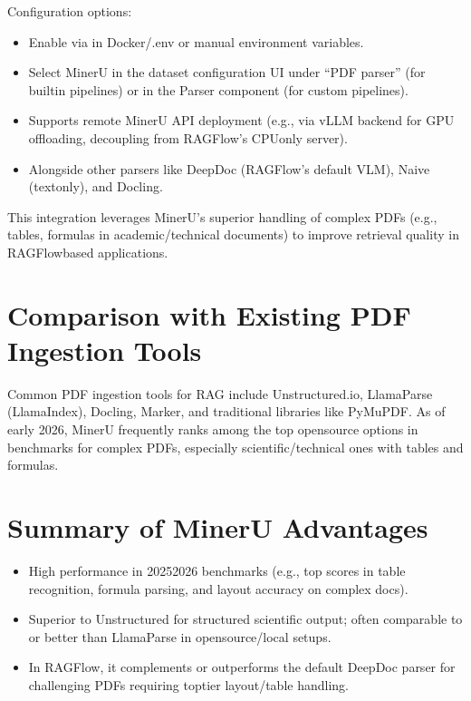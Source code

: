 \documentclass[letterpaper,10pt,english]{sphinxmanual}
\begin{document}
\sphinxAtStartPar
Configuration options:
\begin{itemize}
\item {} 
\sphinxAtStartPar
Enable via  in Docker/.env or manual environment
variables.

\item {} 
\sphinxAtStartPar
Select MinerU in the dataset configuration UI under “PDF parser” (for
built\sphinxhyphen{}in pipelines) or in the Parser component (for custom
pipelines).

\item {} 
\sphinxAtStartPar
Supports remote MinerU API deployment (e.g., via vLLM backend for GPU
offloading, decoupling from RAGFlow’s CPU\sphinxhyphen{}only server).

\item {} 
\sphinxAtStartPar
Alongside other parsers like DeepDoc (RAGFlow’s default VLM), Naive
(text\sphinxhyphen{}only), and Docling.

\end{itemize}

\sphinxAtStartPar
This integration leverages MinerU’s superior handling of complex PDFs
(e.g., tables, formulas in academic/technical documents) to improve
retrieval quality in RAGFlow\sphinxhyphen{}based applications.


\section{Comparison with Existing PDF Ingestion Tools}
\label{\detokenize{minerU:comparison-with-existing-pdf-ingestion-tools}}
\sphinxAtStartPar
Common PDF ingestion tools for RAG include Unstructured.io, LlamaParse
(LlamaIndex), Docling, Marker, and traditional libraries like PyMuPDF.
As of early 2026, MinerU frequently ranks among the top open\sphinxhyphen{}source
options in benchmarks for complex PDFs, especially scientific/technical
ones with tables and formulas.


\section{Summary of MinerU Advantages}
\label{\detokenize{minerU:summary-of-mineru-advantages}}\begin{itemize}
\item {} 
\sphinxAtStartPar
High performance in 2025\textendash{}2026 benchmarks (e.g., top scores in table
recognition, formula parsing, and layout accuracy on complex docs).

\item {} 
\sphinxAtStartPar
Superior to Unstructured for structured scientific output; often
comparable to or better than LlamaParse in open\sphinxhyphen{}source/local setups.

\item {} 
\sphinxAtStartPar
In RAGFlow, it complements or outperforms the default DeepDoc parser
for challenging PDFs requiring top\sphinxhyphen{}tier layout/table handling.

\end{itemize}
\end{document}
